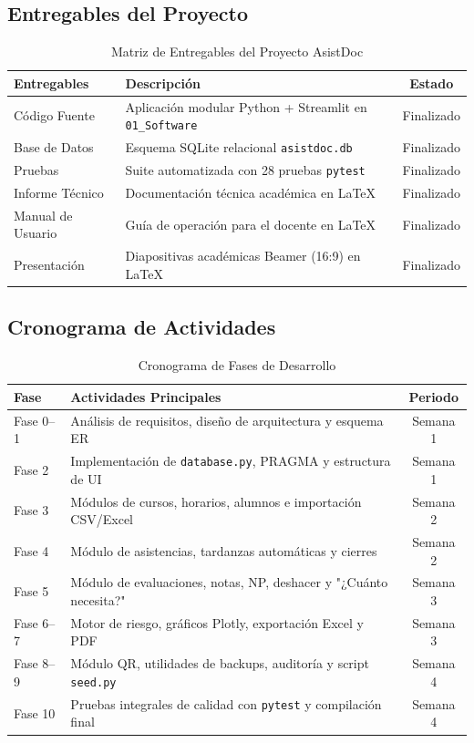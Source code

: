 \documentclass[12pt,a4paper]{article}
\begin{document}
\subsection{Entregables del Proyecto}
\begin{table}[h!]
\centering
\caption{Matriz de Entregables del Proyecto AsistDoc}
\begin{tabularx}{\textwidth}{l X c}
\toprule
\textbf{Entregables} & \textbf{Descripción} & \textbf{Estado} \\
\midrule
Código Fuente & Aplicación modular Python + Streamlit en \texttt{01\_Software} & Finalizado \\
Base de Datos & Esquema SQLite relacional \texttt{asistdoc.db} & Finalizado \\
Pruebas & Suite automatizada con 28 pruebas \texttt{pytest} & Finalizado \\
Informe Técnico & Documentación técnica académica en LaTeX & Finalizado \\
Manual de Usuario & Guía de operación para el docente en LaTeX & Finalizado \\
Presentación & Diapositivas académicas Beamer (16:9) en LaTeX & Finalizado \\
\bottomrule
\end{tabularx}
\end{table}

\subsection{Cronograma de Actividades}
\begin{table}[h!]
\centering
\caption{Cronograma de Fases de Desarrollo}
\begin{tabularx}{\textwidth}{l X c}
\toprule
\textbf{Fase} & \textbf{Actividades Principales} & \textbf{Periodo} \\
\midrule
Fase 0--1 & Análisis de requisitos, diseño de arquitectura y esquema ER & Semana 1 \\
Fase 2 & Implementación de \texttt{database.py}, PRAGMA y estructura de UI & Semana 1 \\
Fase 3 & Módulos de cursos, horarios, alumnos e importación CSV/Excel & Semana 2 \\
Fase 4 & Módulo de asistencias, tardanzas automáticas y cierres & Semana 2 \\
Fase 5 & Módulo de evaluaciones, notas, NP, deshacer y "¿Cuánto necesita?" & Semana 3 \\
Fase 6--7 & Motor de riesgo, gráficos Plotly, exportación Excel y PDF & Semana 3 \\
Fase 8--9 & Módulo QR, utilidades de backups, auditoría y script \texttt{seed.py} & Semana 4 \\
Fase 10 & Pruebas integrales de calidad con \texttt{pytest} y compilación final & Semana 4 \\
\bottomrule
\end{tabularx}
\end{table}
\end{document}
